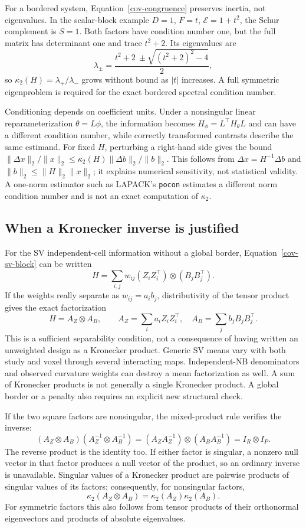 For a bordered system, Equation~\eqref{cov-congruence} preserves
inertia, not eigenvalues.  In the scalar-block example
$D=1$, $F=t$, $\mathcal E=1+t^2$, the Schur complement is $S=1$.
Both factors have condition number one, but the full matrix has
determinant one and trace $t^2+2$.  Its eigenvalues are
\[
 \lambda_\pm=\frac{t^2+2\ \pm\sqrt{(t^2+2)^2-4}}2,
\]
so $\kappa_2(H)=\lambda_+/\lambda_-$ grows without bound as
$|t|$ increases.  A full symmetric eigenproblem is required for
the exact bordered spectral condition number.

Conditioning depends on coefficient units.  Under a nonsingular linear
reparameterization $\theta=L\phi$, the information becomes
$H_\phi=L^\top H_\theta L$ and can have a different condition number,
while correctly transformed contrasts describe the same estimand.
For fixed $H$, perturbing a right-hand side gives the bound
$\|\Delta x\|_2/\|x\|_2
\leq\kappa_2(H)\|\Delta b\|_2/\|b\|_2$.
This follows from $\Delta x=H^{-1}\Delta b$ and
$\|b\|_2\leq\|H\|_2\|x\|_2$; it explains numerical sensitivity,
not statistical validity.  A one-norm estimator such as LAPACK's
\texttt{pocon} estimates a different norm condition number and is
not an exact computation of $\kappa_2$.

\subsection{When a Kronecker inverse is justified}
\label{cov-kronecker}

For the SV independent-cell information without a global border,
Equation~\eqref{cov-sv-block} can be written
\[
 H=\sum_{i,j}w_{ij}(Z_iZ_i^\top)\otimes(B_jB_j^\top).
\]
If the weights really separate as $w_{ij}=a_i b_j$, distributivity
of the tensor product gives the exact factorization
\begin{equation}
 H=A_Z\otimes A_B,\qquad
 A_Z=\sum_i a_iZ_iZ_i^\top,\quad
 A_B=\sum_j b_jB_jB_j^\top .
 \label{cov-kron-factorization}
\end{equation}
This is a sufficient separability condition, not a consequence of
having written an unweighted design as a Kronecker product.  Generic
SV means vary with both study and voxel through several interacting
maps.  Independent-NB denominators and observed curvature weights
can destroy a mean factorization as well.  A sum of Kronecker products
is not generally a single Kronecker product.  A global border or a
penalty also requires an explicit new structural check.

If the two square factors are nonsingular, the mixed-product rule
verifies the inverse:
\[
 (A_Z\otimes A_B)(A_Z^{-1}\otimes A_B^{-1})
 =(A_ZA_Z^{-1})\otimes(A_BA_B^{-1})=I_R\otimes I_P.
\]
The reverse product is the identity too.  If either factor is singular,
a nonzero null vector in that factor produces a null vector of the
product, so an ordinary inverse is unavailable.  Singular values
of a Kronecker product are pairwise products of singular values of
its factors; consequently, for nonsingular factors,
\[
 \kappa_2(A_Z\otimes A_B)=\kappa_2(A_Z)\kappa_2(A_B).
\]
For symmetric factors this also follows from tensor products of their
orthonormal eigenvectors and products of absolute eigenvalues.

